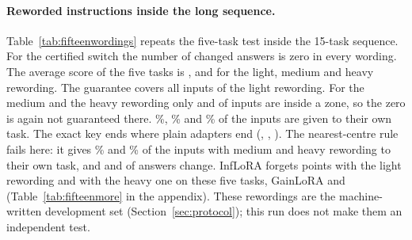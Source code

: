 \paragraph{Reworded instructions inside the long sequence.} Table~\ref{tab:fifteenwordings} repeats
the five-task test inside the 15-task sequence. For the certified switch the number of changed
answers is zero in every wording. The average score of the five tasks is \FifteenCertAPLight{},
\FifteenCertAPMedium{} and \FifteenCertAPHeavy{} for the light, medium and heavy rewording. The
guarantee covers all \FifteenCertZoneOneLight{} inputs of the light rewording. For the medium and
the heavy rewording only \FifteenCertZoneOneMedium{} and \FifteenCertZoneOneHeavy{} of
\FifteenCertInputsOneMedium{} inputs are inside a zone, so the zero is again not guaranteed there.
\FifteenCertRightLight{}\%, \FifteenCertRightMedium{}\% and \FifteenCertRightHeavy{}\% of the inputs
are given to their own task. The exact key ends where plain adapters end (\FifteenPlainAPLight{},
\FifteenPlainAPMedium{}, \FifteenPlainAPHeavy{}). The nearest-centre rule \centre{} fails here: it gives \FifteenCentreRightMedium{}\% and
\FifteenCentreRightHeavy{}\% of the inputs with medium and heavy rewording to their own task, and
\FifteenCentreChangedMedium{} and \FifteenCentreChangedHeavy{} of \FifteenCentreComparedHeavy{}
answers change. InfLoRA forgets \FifteenInfFTLight{} points with the light rewording and
\FifteenInfFTHeavy{} with the heavy one on these five tasks, GainLoRA \FifteenGainFTLight{} and
\FifteenGainFTHeavy{} (Table~\ref{tab:fifteenmore} in the appendix). These rewordings are the
machine-written development set (Section~\ref{sec:protocol}); this run does not make
them an independent test.
